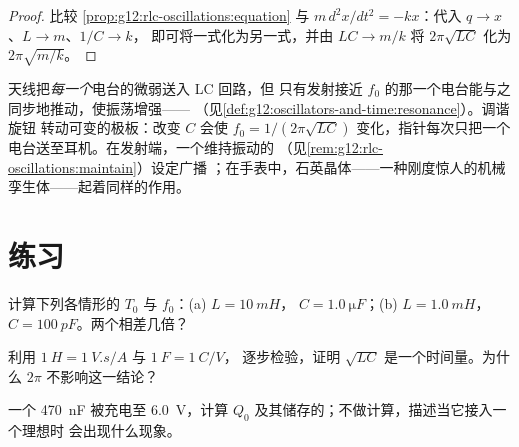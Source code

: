 \begin{proof}
比较 \cref{prop:g12:rlc-oscillations:equation} 与
$m\,d^2x/dt^2 = -kx$：代入 $q \to x$、$L \to m$、$1/C \to k$，
即可将一式化为另一式，并由 $LC \to m/k$ 将
$2\pi\sqrt{LC}$ 化为 $2\pi\sqrt{m/k}$。
\end{proof}

\begin{example}[调谐收音机]\label{ex:g12:rlc-oscillations:tuning}
天线把\emph{每一个}电台的微弱送入 LC 回路，但
只有发射接近 $f_0$ 的那一个电台能与之同步地推动，使振荡增强——
（见\cref{def:g12:oscillators-and-time:resonance}）。调谐旋钮
转动可变的极板：改变 $C$ 会使
$f_0 = 1/(2\pi\sqrt{LC})$ 变化，指针每次只把一个
电台送至耳机。在发射端，一个维持振动的
（见\cref{rem:g12:rlc-oscillations:maintain}）设定广播
；在手表中，石英晶体——一种刚度惊人的机械
孪生体——起着同样的作用。
\end{example}

\section{练习}

\begin{exercise}[$\star$]\label{exo:g12:rlc-oscillations:1}
计算下列各情形的 $T_0$ 与 $f_0$：(a) $L = \qty{10}{mH}$，
$C = \qty{1.0}{\micro F}$；(b) $L = \qty{1.0}{mH}$，
$C = \qty{100}{pF}$。两个相差几倍？
\end{exercise}

\begin{exercise}[$\star$]\label{exo:g12:rlc-oscillations:2}
利用 $\qty{1}{H} = \qty{1}{V.s/A}$ 与 $\qty{1}{F} = \qty{1}{C/V}$，
逐步检验，证明 $\sqrt{LC}$ 是一个时间量。为什么 $2\pi$
不影响这一结论？
\end{exercise}

\begin{exercise}[$\star$]\label{exo:g12:rlc-oscillations:3}
一个 \qty{470}{nF} 被充电至 \qty{6.0}{V}，计算 $Q_0$
及其储存的；不做计算，描述当它接入一个理想时
会出现什么现象。
\end{exercise}

